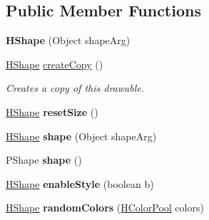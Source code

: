 \subsection*{Public Member Functions}
\begin{DoxyCompactItemize}
\item 
\hypertarget{classhype_1_1drawable_1_1_h_shape_a53f04e8c4012ccb8577b1877637cd878}{{\bfseries H\-Shape} (Object shape\-Arg)}\label{classhype_1_1drawable_1_1_h_shape_a53f04e8c4012ccb8577b1877637cd878}

\item 
\hyperlink{classhype_1_1drawable_1_1_h_shape}{H\-Shape} \hyperlink{classhype_1_1drawable_1_1_h_shape_a3c87e6bdac6bbfeced9d25bfac8527b3}{create\-Copy} ()
\begin{DoxyCompactList}\small\item\em Creates a copy of this drawable. \end{DoxyCompactList}\item 
\hypertarget{classhype_1_1drawable_1_1_h_shape_a7b53aa8764021e6036540ceb0750541c}{\hyperlink{classhype_1_1drawable_1_1_h_shape}{H\-Shape} {\bfseries reset\-Size} ()}\label{classhype_1_1drawable_1_1_h_shape_a7b53aa8764021e6036540ceb0750541c}

\item 
\hypertarget{classhype_1_1drawable_1_1_h_shape_ae495de06427f5e8349fb3bd0274f6c29}{\hyperlink{classhype_1_1drawable_1_1_h_shape}{H\-Shape} {\bfseries shape} (Object shape\-Arg)}\label{classhype_1_1drawable_1_1_h_shape_ae495de06427f5e8349fb3bd0274f6c29}

\item 
\hypertarget{classhype_1_1drawable_1_1_h_shape_a2df9d3cd17b1a313c9967ba38178883f}{P\-Shape {\bfseries shape} ()}\label{classhype_1_1drawable_1_1_h_shape_a2df9d3cd17b1a313c9967ba38178883f}

\item 
\hypertarget{classhype_1_1drawable_1_1_h_shape_a9495563e316f5aaf8faa2dee58197e0a}{\hyperlink{classhype_1_1drawable_1_1_h_shape}{H\-Shape} {\bfseries enable\-Style} (boolean b)}\label{classhype_1_1drawable_1_1_h_shape_a9495563e316f5aaf8faa2dee58197e0a}

\item 
\hypertarget{classhype_1_1drawable_1_1_h_shape_a7441b10593eac2f91f0a6a0096bdee2d}{\hyperlink{classhype_1_1drawable_1_1_h_shape}{H\-Shape} {\bfseries random\-Colors} (\hyperlink{classhype_1_1colorist_1_1_h_color_pool}{H\-Color\-Pool} colors)}\label{classhype_1_1drawable_1_1_h_shape_a7441b10593eac2f91f0a6a0096bdee2d}


\end{DoxyCompactItemize}
